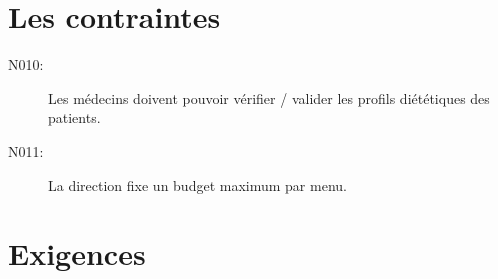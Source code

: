\section{Les contraintes}
\begin{description}
\item[N010:] Les médecins doivent pouvoir vérifier / valider les profils
diététiques des patients.
\item[N011:] La direction fixe un budget maximum par menu.
\end{description}

\section{Exigences}



